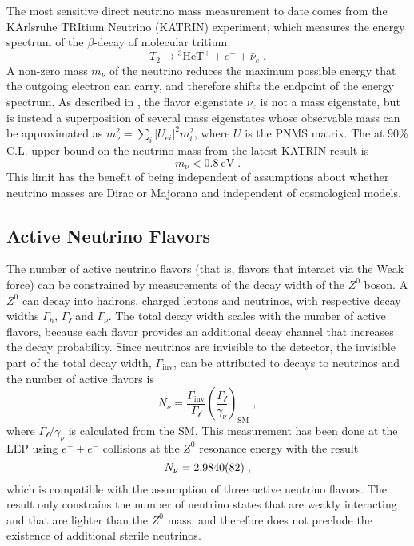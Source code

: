 The most sensitive direct neutrino mass measurement to date comes from the KArlsruhe TRItium Neutrino (KATRIN) experiment, which measures the energy spectrum of the $\beta$-decay of molecular tritium
\begin{equation}
    T_2 \rightarrow \mathrm{^3HeT^+} + e^- + \bar{\nu}_e\;.
\end{equation}
A non-zero mass $m_\nu$ of the neutrino reduces the maximum possible energy that the outgoing electron can carry, and therefore shifts the endpoint of the energy spectrum.
As described in , the flavor eigenstate $\nu_e$ is not a mass eigenstate, but is instead a superposition of several mass eigenstates whose observable mass can be approximated as $m^2_\nu = \sum_i |U_{ei}|^2m_i^2$, where $U$ is the PNMS matrix.
The at 90\% C.L.
upper bound on the neutrino mass from the latest KATRIN result\cite{KATRIN2022} is
\begin{equation}
    m_\nu < \SI{0.8}{\eV}\;.
\end{equation}
This limit has the benefit of being independent of assumptions about whether neutrino masses are Dirac or Majorana and independent of cosmological models.

\subsection{Active Neutrino Flavors}

The number of active neutrino flavors (that is, flavors that interact via the Weak force) can be constrained by measurements of the decay width of the $Z^0$ boson.
A $Z^0$ can decay into hadrons, charged leptons and neutrinos, with respective decay widths $\Gamma_h$, $\Gamma_\mathcal{l}$ and $\Gamma_\nu$.
The total decay width scales with the number of active flavors, because each flavor provides an additional decay channel that increases the decay probability.
Since neutrinos are invisible to the detector, the invisible part of the total decay width, $\Gamma_\mathrm{inv}$, can be attributed to decays to neutrinos and the number of active flavors is
\begin{equation}
    N_\nu = \frac{\Gamma_\mathrm{inv}}{\Gamma_\mathcal{l}}\left( \frac{\Gamma_\mathcal{l}}{\gamma_\nu} \right)_\mathrm{SM}\;,
\end{equation}
where $\Gamma_\mathcal{l} / \gamma_\nu$ is calculated from the SM. This measurement has been done at the LEP using $e^+ + e^-$ collisions at the $Z^0$ resonance energy with the result
\begin{equation}
    N_\nu = \num{2.9840 +- 0.0082}\;,
\end{equation}
which is compatible with the assumption of three active neutrino flavors.
The result only constrains the number of neutrino states that are weakly interacting and that are lighter than the $Z^0$ mass, and therefore does not preclude the existence of additional sterile neutrinos.



